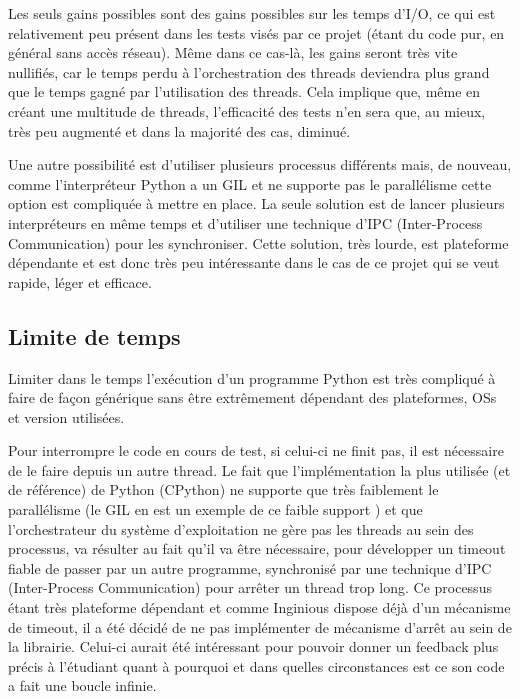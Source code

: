 \documentclass[a4paper]{report}
\begin{document}
Les seuls gains possibles sont des gains possibles sur les temps d'I/O, ce qui est relativement peu présent dans les tests visés par ce projet (étant du code pur, en général sans accès réseau).
Même dans ce cas-là, les gains seront très vite nullifiés, car le temps perdu à l'orchestration des threads deviendra plus grand que le temps gagné par l'utilisation des threads.
Cela implique que, même en créant une multitude de threads, l'efficacité des tests n'en sera que, au mieux, très peu augmenté et dans la majorité des cas, diminué.

Une autre possibilité est d'utiliser plusieurs processus différents mais, de nouveau, comme l'interpréteur Python a un GIL \cite{pythonGlobalInterpreterLockPython} et ne supporte pas le parallélisme cette option est compliquée à mettre en place.
La seule solution est de lancer plusieurs interpréteurs en même temps et d'utiliser une technique d'IPC (Inter-Process Communication) pour les synchroniser.
Cette solution, très lourde, est plateforme dépendante et est donc très peu intéressante dans le cas de ce projet qui se veut rapide, léger et efficace.


\subsection{Limite de temps}
Limiter dans le temps l'exécution d'un programme Python est très compliqué à faire de façon générique sans être extrêmement dépendant des plateformes, OSs et version utilisées.

Pour interrompre le code en cours de test, si celui-ci ne finit pas, il est nécessaire de le faire depuis un autre thread.
Le fait que l'implémentation la plus utilisée (et de référence) de Python (CPython) ne supporte que très faiblement le parallélisme (le GIL en est un exemple de ce faible support \cite{archiveThreadStateGIDPython}\cite{pythonGlobalInterpreterLockPython}) et que l'orchestrateur du système d'exploitation ne gère pas les threads au sein des processus, va résulter au fait qu'il va être nécessaire, pour développer un timeout fiable de passer par un autre programme, synchronisé par une technique d'IPC (Inter-Process Communication) pour arrêter un thread trop long.
Ce processus étant très plateforme dépendant et comme Inginious dispose déjà d'un mécanisme de timeout, il a été décidé de ne pas implémenter de mécanisme d'arrêt au sein de la librairie.
Celui-ci aurait été intéressant pour pouvoir donner un feedback plus précis à l'étudiant quant à pourquoi et dans quelles circonstances est ce son code a fait une boucle infinie.
\end{document}
